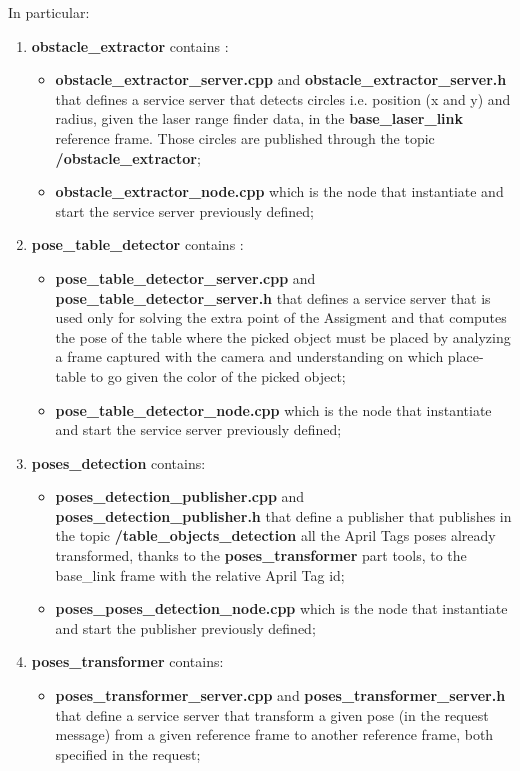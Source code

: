In particular:
\begin{enumerate}
    \item \textbf{obstacle\_extractor} contains :
    \begin{itemize}
        \item \textbf{obstacle\_extractor\_server.cpp} and \textbf{obstacle\_extractor\_server.h} that defines a service server that detects circles i.e. position (x and y) and radius, given the laser range finder data, in the \textbf{base\_laser\_link} reference frame. Those circles are published through the topic \textbf{/obstacle\_extractor};
        \item \textbf{obstacle\_extractor\_node.cpp} which is the node that instantiate and start the service server previously defined;
    \end{itemize}
    \item \textbf{pose\_table\_detector} contains :
    \begin{itemize}
        \item \textbf{pose\_table\_detector\_server.cpp} and \textbf{pose\_table\_detector\_server.h} that defines a service server that is used only for solving the extra point of the Assigment and that computes the pose of the table where the picked object must be placed by analyzing a frame captured with the camera and understanding on which place-table to go given the color of the picked object;
        \item \textbf{pose\_table\_detector\_node.cpp} which is the node that instantiate and start the service server previously defined;
    \end{itemize}
    \item \textbf{poses\_detection} contains: 
    \begin{itemize}
        \item \textbf{poses\_detection\_publisher.cpp} and \textbf{poses\_detection\_publisher.h} that define a publisher that publishes in the topic \textbf{/table\_objects\_detection} all the April Tags poses already transformed, thanks to the \textbf{poses\_transformer} part tools, to the base\_link frame with the relative April Tag id;
        \item \textbf{poses\_poses\_detection\_node.cpp} which is the node that instantiate and start the publisher previously defined;
    \end{itemize}
    \item \textbf{poses\_transformer} contains: 
    \begin{itemize}
        \item \textbf{poses\_transformer\_server.cpp} and \textbf{poses\_transformer\_server.h} that define a service server that transform a given pose (in the request message) from a given reference frame to another reference frame, both specified in the request;

\end{itemize}
\end{enumerate}
